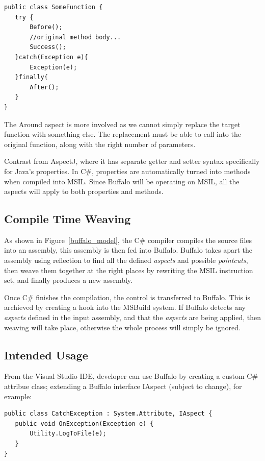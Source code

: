 \begin{lstlisting}[caption={Buffalo aspects}, label=boundaryaspect]
public class SomeFunction {
   try {
       Before();
       //original method body...
       Success();
   }catch(Exception e){
       Exception(e);
   }finally{
       After();
   }
}
\end{lstlisting}

The Around aspect is more involved as we cannot simply replace the target function with something else. The replacement must be able to call into the original function, along with the right number of parameters.

Contrast from AspectJ, where it has separate getter and setter syntax specifically for Java's properties. In C\#, properties are automatically turned into methods when compiled into MSIL. Since Buffalo will be operating on MSIL, all the aspects will apply to both properties and methods.

\subsection{Compile Time Weaving}
As shown in Figure~\ref{buffalo_model}, the C\# compiler compiles the source files into an assembly, this assembly is then fed into Buffalo. Buffalo takes apart the assembly using reflection to find all the defined {\em aspects} and possible {\em pointcuts}, then weave them together at the right places by rewriting the MSIL instruction set, and finally produces a new assembly.

Once C\# finishes the compilation, the control is transferred to Buffalo. This is archieved by creating a hook into the MSBuild system. If Buffalo detects any {\em aspects} defined in the input assembly, and that the {\em aspects} are being applied, then weaving will take place, otherwise the whole process will simply be ignored.

\subsection{Intended Usage}
From the Visual Studio IDE, developer can use Buffalo by creating a custom C\# attribue class; extending a Buffalo interface IAspect (subject to change), for example:

\begin{lstlisting}[caption={Buffalo aspect}, label=buffalocode]
public class CatchException : System.Attribute, IAspect {
   public void OnException(Exception e) {
       Utility.LogToFile(e);
   } 
}
\end{lstlisting}

